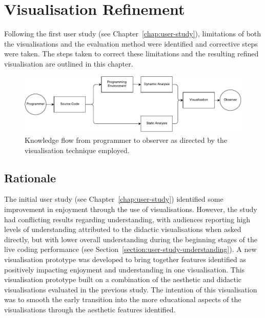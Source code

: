 
\chapter{Visualisation Refinement}
\label{chap:visualisation-refinement}

Following the first user study (see Chapter~\ref{chap:user-study}), limitations of both the visualisations and the evaluation method were identified and corrective steps were taken. The steps taken to correct these limitations and the resulting refined visualisation are outlined in this chapter.

\begin{figure}
  \centering \includegraphics[width=\columnwidth]{../images/diagrams/knowledge-flow-refined.pdf}
  \caption{Knowledge flow from programmer to observer as directed by the visualisation technique employed.}
\label{fig:knowledge-flow-refined}
\end{figure}

\section{Rationale}

The initial user study (see Chapter~\ref{chap:user-study}) identified some improvement in enjoyment through the use of visualisations. However, the study had conflicting results regarding understanding, with audiences reporting high levels of understanding attributed to the didactic visualisations when asked directly, but with lower overall understanding during the beginning stages of the live coding performance (see Section~\ref{section:user-study-understanding}). A new visualisation prototype was developed to bring together features identified as positively impacting enjoyment and understanding in one visualisation. This visualisation prototype built on a combination of the aesthetic and didactic visualisations evaluated in the previous study. The intention of this visualisation was to smooth the early transition into the more educational aspects of the visualisations through the aesthetic features identified.

